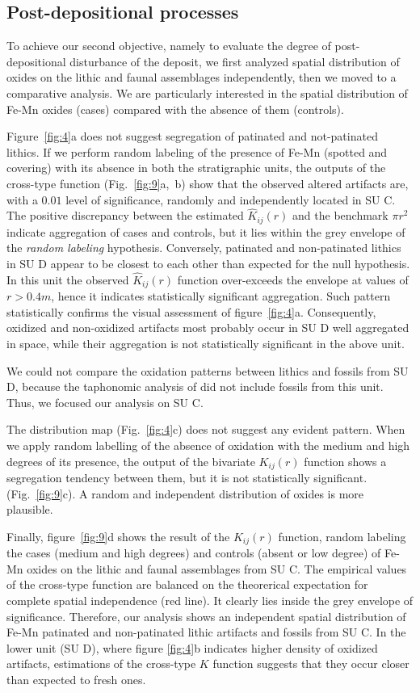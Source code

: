 \documentclass[review,authoryear]{elsarticle} %
\begin{document}
\subsection{Post-depositional processes}

To achieve our second objective, namely to evaluate the degree of post-depositional disturbance of the deposit, we first analyzed spatial distribution of oxides on the lithic and faunal assemblages independently, then we moved to a comparative analysis. We are particularly interested in the spatial distribution of Fe-Mn oxides (cases) compared with the absence of them (controls).

Figure~\ref{fig:4}a does not suggest segregation of patinated and not-patinated lithics. If we perform random labeling of the presence of Fe-Mn (spotted and covering) with its absence in both the stratigraphic units, the outputs of the cross-type function (Fig.~\ref{fig:9}a,~b) show that the observed altered artifacts are, with a $0.01$ level of significance, randomly and independently located in SU C. The positive discrepancy between the estimated $\hat K_{ij}(r)$ and the benchmark $\pi r^2$ indicate aggregation of cases and controls, but it lies within the grey envelope of the \emph{random labeling} hypothesis. Conversely, patinated and non-patinated lithics in SU D appear to be closest to each other than expected for the null hypothesis. In this unit the observed $\hat K_{ij}(r)$ function over-exceeds the envelope at values of $r>0.4 m$, hence it indicates statistically significant aggregation. Such pattern statistically confirms the visual assessment of figure~\ref{fig:4}a. Consequently, oxidized and non-oxidized artifacts most probably occur in SU D well aggregated in space, while their aggregation is not statistically significant in the above unit.

We could not compare the oxidation patterns between lithics and fossils from SU D, because the taphonomic analysis of \citet{Bagnus2011} did not include fossils from this unit. Thus, we focused our analysis on SU C.

The distribution map (Fig.~\ref{fig:4}c) does not suggest any evident pattern. When we apply random labelling of the absence of oxidation with the medium and high degrees of its presence, the output of the bivariate $K_{ij}(r)$ function shows a segregation tendency between them, but it is not statistically significant. (Fig.~\ref{fig:9}c). A random and independent distribution of oxides is more plausible.

Finally, figure~\ref{fig:9}d shows the result of the $K_{ij}(r)$ function, random labeling the cases (medium and high degrees) and controls (absent or low degree) of Fe-Mn oxides on the lithic and faunal assemblages from SU C. The empirical values of the cross-type function are balanced on the theorerical expectation for complete spatial independence (red line). It clearly lies inside the grey envelope of significance. Therefore, our analysis shows an independent spatial distribution of Fe-Mn patinated and non-patinated lithic artifacts and fossils from SU C. In the lower unit (SU D), where figure \ref{fig:4}b indicates higher density of oxidized artifacts, estimations of the cross-type $K$ function suggests that they occur closer than expected to fresh ones.
\end{document}
